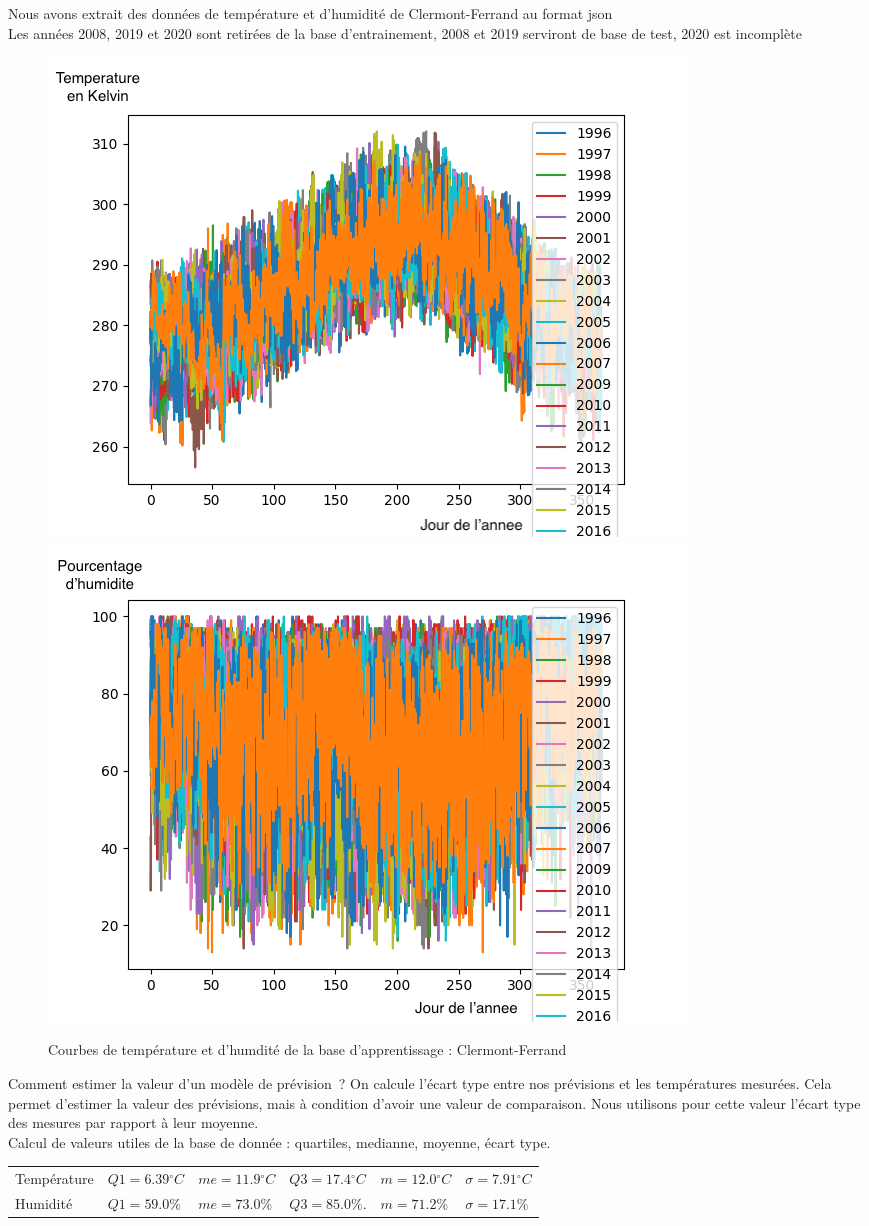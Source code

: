 \documentclass[11pt,a4paper]{article}
\begin{document}
Nous avons extrait des données de température et d'humidité de Clermont-Ferrand au format json \\
Les années 2008, 2019 et 2020 sont retirées de la base d'entrainement, 2008 et 2019 serviront de base de test, 2020 est incomplète\\
\begin{figure} [!h]
\centering
\includegraphics[width=0.48 \textwidth]{./imagesTIPE/temperature.png}\quad
\includegraphics[width=0.48 \textwidth]{./imagesTIPE/humidite.png}
\caption{\label{fig:190101Lolita} Courbes de température et d'humdité de la base d'apprentissage : Clermont-Ferrand}
\end{figure}

Comment estimer la valeur d'un modèle de prévision~? On calcule l'écart type entre nos prévisions et les températures mesurées. Cela permet d'estimer la valeur des prévisions, mais à condition d'avoir une valeur de comparaison. Nous utilisons pour cette valeur l'écart type des mesures par rapport à leur moyenne.
 \\ Calcul de valeurs utiles de la base de donnée : quartiles, medianne, moyenne, écart type.\\ 
 
\begin{tabular}{llllll}\hline\hline
Température& $Q1 = 6.39{}^{\circ}C$ &$ me = 11.9 {}^{\circ}C$ & $Q3 = 17.4{}^{\circ}C $&$ m= 12.0{}^{\circ}C $ & $\sigma = 7.91 {}^{\circ}C$ \\
Humidité    &   $ Q1 = 59.0\%$           &$  me = 73.0\%  $           & $Q3 = 85.0\%.           $& $ m=71.2\%  $ & $\sigma = 17.1 \% $ \\
\hline 
\end{tabular} 
\end{document}
